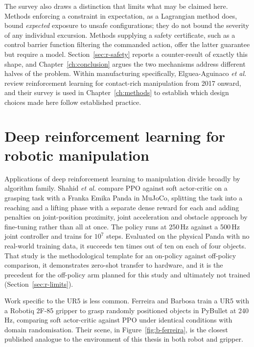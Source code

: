 The survey also draws a distinction that limits what may be claimed here. Methods enforcing a
constraint in expectation, as a Lagrangian method does, bound \emph{expected} exposure to unsafe
configurations; they do not bound the severity of any individual excursion. Methods supplying a
safety certificate, such as a control barrier function filtering the commanded action, offer the
latter guarantee but require a model. Section~\ref{sec:r-safety} reports a counter-result of
exactly this shape, and Chapter~\ref{ch:conclusion} argues the two mechanisms address different
halves of the problem. Within manufacturing specifically, Elguea-Aguinaco \emph{et al.}
\cite{elguea2023review} review reinforcement learning for contact-rich manipulation from 2017
onward, and their survey is used in Chapter~\ref{ch:methods} to establish which design choices
made here follow established practice.

\section{Deep reinforcement learning for robotic manipulation}\label{sec:b-manipulation}

Applications of deep reinforcement learning to manipulation divide broadly by algorithm family.
Shahid \emph{et al.} \cite{shahid2022continuous_grasping} compare PPO against soft actor-critic
on a grasping task with a Franka Emika Panda in MuJoCo, splitting the task into a reaching and a
lifting phase with a separate dense reward for each and adding penalties on joint-position
proximity, joint acceleration and obstacle approach by fine-tuning rather than all at once. The
policy runs at 250\,Hz against a 500\,Hz joint controller and trains for \(10^{7}\) steps.
Evaluated on the physical Panda with no real-world training data, it succeeds ten times out of
ten on each of four objects. That study is the methodological template for an on-policy against
off-policy comparison, it demonstrates zero-shot transfer to hardware, and it is the precedent
for the off-policy arm planned for this study and ultimately not trained
(Section~\ref{sec:r-limits}).

Work specific to the UR5 is less common. Ferreira and Barbosa \cite{ferreira2025grasping} train
a UR5 with a Robotiq 2F-85 gripper to grasp randomly positioned objects in PyBullet at 240\,Hz,
comparing soft actor-critic against PPO under identical conditions with domain randomisation.
Their scene, in Figure~\ref{fig:b-ferreira}, is the closest published analogue to the environment
of this thesis in both robot and gripper.

